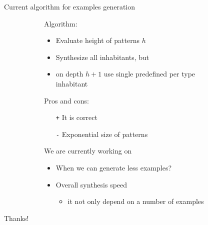 \documentclass[aspectratio=169
  , xcolor={svgnames}
  , hyperref={ colorlinks,citecolor=Blue
             , linkcolor=DarkRed,urlcolor=DarkBlue}
  , russian
  ]{beamer}
\begin{document}
\begin{frame}{Current algorithm for examples generation}
\begin{figure}
\begin{subfigure}[b]{0.45\linewidth}
Algorithm:
\begin{itemize}
\item Evaluate height of patterns $h$
\item Synthesize all inhabitants, but
\item on depth $h+1$ use single predefined per type inhabitant 
\end{itemize}
\end{subfigure}
\hspace{.5cm}
\begin{subfigure}[b]{0.45\linewidth}
Pros and cons:
\begin{itemize}
\item[\texttt{+}] It is correct
\item[\texttt{-}] Exponential size of patterns
\end{itemize}
\vspace{1cm}
We are currently working on
\begin{itemize}
\item When we can generate less examples?
\item Overall synthesis speed
\begin{itemize}
\item it not only depend on a number of examples
\end{itemize}
\end{itemize}
\end{subfigure}
\end{figure}
\vspace{1cm}\pause
\begin{center}
{\Huge Thanks!}
\end{center}
\end{frame}
\end{document}
